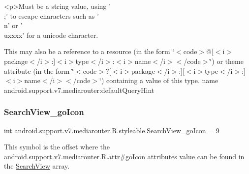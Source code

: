 \begin{DoxyVerb}      <p>Must be a string value, using '\\;' to escape characters such as '\\n' or '\\uxxxx' for a unicode character.
\end{DoxyVerb}
 

This may also be a reference to a resource (in the form \char`\"{}$<$code$>$@\mbox{[}$<$i$>$package$<$/i$>$\+:\mbox{]}$<$i$>$type$<$/i$>$\+:$<$i$>$name$<$/i$>$$<$/code$>$\char`\"{}) or theme attribute (in the form \char`\"{}$<$code$>$?\mbox{[}$<$i$>$package$<$/i$>$\+:\mbox{]}\mbox{[}$<$i$>$type$<$/i$>$\+:\mbox{]}$<$i$>$name$<$/i$>$$<$/code$>$\char`\"{}) containing a value of this type.  name android.\+support.\+v7.\+mediarouter\+:default\+Query\+Hint \mbox{\label{classandroid_1_1support_1_1v7_1_1mediarouter_1_1R_1_1styleable_a3caf53e79313da629e99a8bb5fe0a8f8}} 
\subsubsection{\texorpdfstring{Search\+View\+\_\+go\+Icon}{SearchView\_goIcon}}
{\footnotesize\ttfamily int android.\+support.\+v7.\+mediarouter.\+R.\+styleable.\+Search\+View\+\_\+go\+Icon = 9\hspace{0.3cm}{\ttfamily [static]}}

This symbol is the offset where the \hyperlink{classandroid_1_1support_1_1v7_1_1mediarouter_1_1R_1_1attr_a0f1539bfc582bd52fb633901a0844110}{android.\+support.\+v7.\+mediarouter.\+R.\+attr\#go\+Icon} attribute\textquotesingle{}s value can be found in the \hyperlink{classandroid_1_1support_1_1v7_1_1mediarouter_1_1R_1_1styleable_a5573e3195bf93122a37c69394418c7d7}{Search\+View} array.

